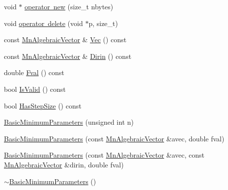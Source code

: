 \begin{DoxyCompactItemize}
\item 
void $\ast$ \mbox{\hyperlink{classROOT_1_1Minuit2_1_1BasicMinimumParameters_a5258a9959c0b6ff699a9200dad4caee0}{operator new}} (size\+\_\+t nbytes)
\item 
void \mbox{\hyperlink{classROOT_1_1Minuit2_1_1BasicMinimumParameters_aaaef6d3167e6f4a88182d6f171641fb9}{operator delete}} (void $\ast$p, size\+\_\+t)
\item 
const \mbox{\hyperlink{namespaceROOT_1_1Minuit2_a62ed97730a1ca8d3fbaec64a19aa11c9}{Mn\+Algebraic\+Vector}} \& \mbox{\hyperlink{classROOT_1_1Minuit2_1_1BasicMinimumParameters_ae8dc429aa9491e545efd916d4f72f8dd}{Vec}} () const
\item 
const \mbox{\hyperlink{namespaceROOT_1_1Minuit2_a62ed97730a1ca8d3fbaec64a19aa11c9}{Mn\+Algebraic\+Vector}} \& \mbox{\hyperlink{classROOT_1_1Minuit2_1_1BasicMinimumParameters_a4a4abef44e633bce699eb280228702e1}{Dirin}} () const
\item 
double \mbox{\hyperlink{classROOT_1_1Minuit2_1_1BasicMinimumParameters_a5d92e23ec6117dd29e3e7e2b62ebaf16}{Fval}} () const
\item 
bool \mbox{\hyperlink{classROOT_1_1Minuit2_1_1BasicMinimumParameters_a095b6bfb0949e1d64ef40a94c5d605d6}{Is\+Valid}} () const
\item 
bool \mbox{\hyperlink{classROOT_1_1Minuit2_1_1BasicMinimumParameters_a482374735681f4f24417e7cd1af044df}{Has\+Step\+Size}} () const
\item 
\mbox{\hyperlink{classROOT_1_1Minuit2_1_1BasicMinimumParameters_ac3a8db51a43b7f99f9e71dcfb9ca9009}{Basic\+Minimum\+Parameters}} (unsigned int n)
\item 
\mbox{\hyperlink{classROOT_1_1Minuit2_1_1BasicMinimumParameters_aebd12d902d3b0badb28a804ccfb4ed8a}{Basic\+Minimum\+Parameters}} (const \mbox{\hyperlink{namespaceROOT_1_1Minuit2_a62ed97730a1ca8d3fbaec64a19aa11c9}{Mn\+Algebraic\+Vector}} \&avec, double fval)
\item 
\mbox{\hyperlink{classROOT_1_1Minuit2_1_1BasicMinimumParameters_a37ff3c6b2ad9075c4c3e347af3febcbe}{Basic\+Minimum\+Parameters}} (const \mbox{\hyperlink{namespaceROOT_1_1Minuit2_a62ed97730a1ca8d3fbaec64a19aa11c9}{Mn\+Algebraic\+Vector}} \&avec, const \mbox{\hyperlink{namespaceROOT_1_1Minuit2_a62ed97730a1ca8d3fbaec64a19aa11c9}{Mn\+Algebraic\+Vector}} \&dirin, double fval)
\item 
\mbox{\hyperlink{classROOT_1_1Minuit2_1_1BasicMinimumParameters_a425049822924a832736afbf3b21dcdb6}{$\sim$\+Basic\+Minimum\+Parameters}} ()
\item 

\end{DoxyCompactItemize}
